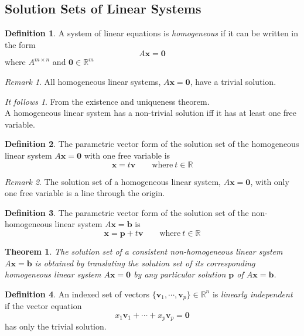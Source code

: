 \documentclass{article}
\renewcommand{\vec}[1]{\textbf{#1}}
\newtheorem{theorem}{Theorem}[section]
\theoremstyle{definition}
\newtheorem{definition}{Definition}[section]
\theoremstyle{remark}
\newtheorem*{remark}{Remark}
\theoremstyle{remark}
\theoremstyle{remark}
\newtheorem*{it follows}{It follows}
\begin{document}
\subsection{Solution Sets of Linear Systems}

\begin{definition}
  A system of linear equations is \textit{homogeneous} if it can be written in the form
  $$A \vec{x} = \vec{0}$$
  where $A^{m \times n}$ and $\vec{0} \in \mathbb{R}^m$
\end{definition}

\begin{remark}
  All homogeneous linear systems, $A\vec{x} = \vec{0}$, have a trivial solution.
\end{remark}

\begin{it follows}
  From the existence and uniqueness theorem. \\
  A homogeneous linear system has a non-trivial solution iff it has at least one free variable.
\end{it follows}

\begin{definition}
  The parametric vector form of the solution set of the homogeneous linear system $A\vec{x} = \vec{0}$ with one free variable is
  $$ \vec{x} = t\vec{v} \qquad \text{where}\ t \in \mathbb{R}$$
\end{definition}

\begin{remark}
  The solution set of a homogeneous linear system, $A\vec{x} = \vec{0}$, with only one free variable is a line through the origin.
\end{remark}

\begin{definition}
  The parametric vector form of the solution set of the non-homogeneous linear system $A\vec{x} = \vec{b}$ is
  $$ \vec{x} = \vec{p} + t\vec{v} \qquad \text{where}\ t \in \mathbb{R}$$
\end{definition}

\begin{theorem}
  The solution set of a consistent non-homogeneous linear system $A\vec{x} = \vec{b}$ is obtained by translating the solution set of its corresponding homogeneous linear system $A\vec{x} = \vec{0}$ by any particular solution $\vec{p}$ of $A\vec{x} = \vec{b}$.
\end{theorem}

\begin{definition}
  An indexed set of vectors $\{\vec{v}_1, \cdots, \vec{v}_p \} \in \mathbb{R}^n$ is \textit{linearly independent} if the vector equation
  $$x_1\vec{v}_1 + \cdots + x_p\vec{v}_p = \vec{0}$$
  has only the trivial solution.
\end{definition}
\end{document}
